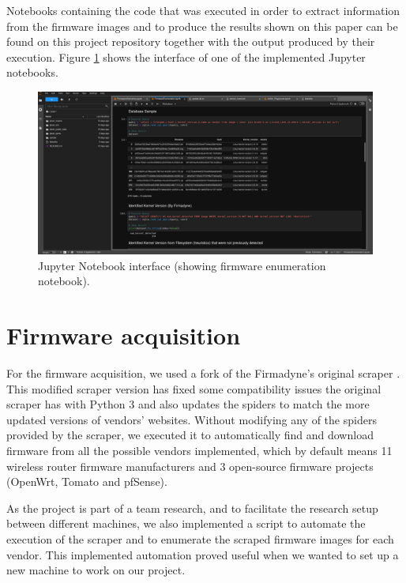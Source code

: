 Notebooks containing the code that was executed in order to extract information from the firmware images and to produce the results shown on this paper can be found on this project repository \cite{github:c2dc-toso} together with the output produced by their execution. Figure \ref{fig:jupyter} shows the interface of one of the implemented Jupyter notebooks.

\begin{figure}[H]
    \centering
    \includegraphics[width=1.0\textwidth]{figs/jupyter.png}
    \caption{Jupyter Notebook interface (showing firmware enumeration notebook).}
    \label{fig:jupyter}
\end{figure}

\section{Firmware acquisition}
\label{sec:firmware-aquisition}

For the firmware acquisition, we used a fork of the Firmadyne's \cite{firmadyne} original scraper \cite{github:scraper}. This modified scraper version has fixed some compatibility issues the original scraper has with Python 3 and also updates the spiders to match the more updated versions of vendors' websites. Without modifying any of the spiders provided by the scraper, we executed it to automatically find and download firmware from all the possible vendors implemented, which by default means 11 wireless router firmware manufacturers and 3 open-source firmware projects (OpenWrt, Tomato and pfSense).

As the project is part of a team research, and to facilitate the research setup between different machines, we also implemented a script to automate the execution of the scraper and to enumerate the scraped firmware images for each vendor. This implemented automation proved useful when we wanted to set up a new machine to work on our project.

